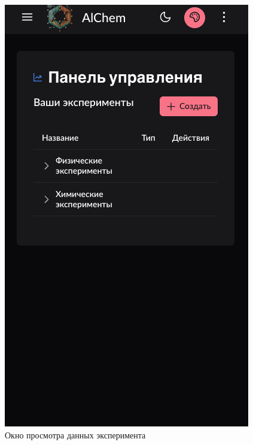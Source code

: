 \begin{figure}[H]
    \centering
    \begin{minipage}{0.45\linewidth}
        \centering
        \includegraphics[width=\linewidth]{img/mobile_version.png}
        \caption{Окно просмотра данных эксперимента}
        \label{pic:mobile_version}
    \end{minipage}\hfill
    \begin{minipage}{0.45\linewidth}
        \centering

\end{minipage}
\end{figure}
